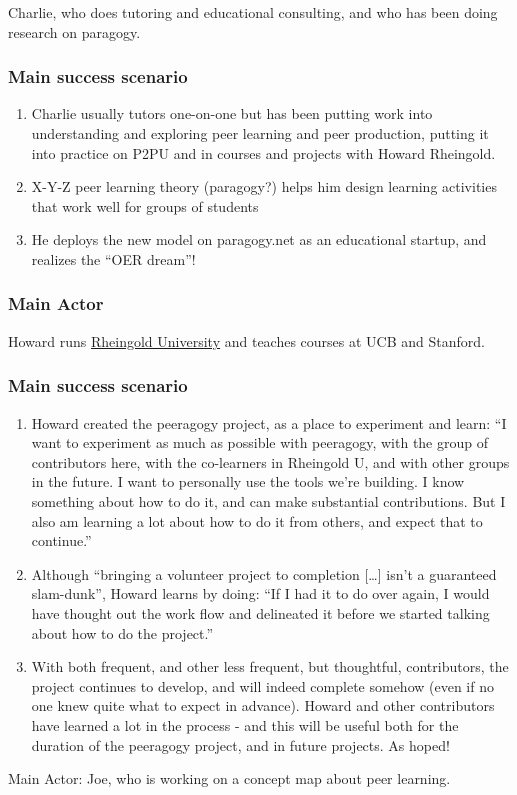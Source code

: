 Charlie, who does tutoring and educational consulting, and who has been
doing research on paragogy.

\subsubsection{Main success scenario}

\begin{enumerate}
\item
  Charlie usually tutors one-on-one but has been putting work into
  understanding and exploring peer learning and peer production, putting
  it into practice on P2PU and in courses and projects with Howard
  Rheingold.
\item
  X-Y-Z peer learning theory (paragogy?) helps him design learning
  activities that work well for groups of students
\item
  He deploys the new model on paragogy.net as an educational startup,
  and realizes the ``OER dream''!
\end{enumerate}
\subsubsection{Main Actor}

Howard runs \href{http://www.rheingold.com/university/}{Rheingold
University} and teaches courses at UCB and Stanford.

\subsubsection{Main success scenario}

\begin{enumerate}
\item
  Howard created the peeragogy project, as a place to experiment and
  learn: ``I want to experiment as much as possible with peeragogy, with
  the group of contributors here, with the co-learners in Rheingold U,
  and with other groups in the future. I want to personally use the
  tools we're building. I know something about how to do it, and can
  make substantial contributions. But I also am learning a lot about how
  to do it from others, and expect that to continue.''
\item
  Although ``bringing a volunteer project to completion {[}\ldots{}{]}
  isn't a guaranteed slam-dunk'', Howard learns by doing: ``If I had it
  to do over again, I would have thought out the work flow and
  delineated it before we started talking about how to do the project.''
\item
  With both frequent, and other less frequent, but thoughtful,
  contributors, the project continues to develop, and will indeed
  complete somehow (even if no one knew quite what to expect in
  advance). Howard and other contributors have learned a lot in the
  process - and this will be useful both for the duration of the
  peeragogy project, and in future projects. As hoped!
\end{enumerate}
Main Actor: Joe, who is working on a concept map about peer learning.

